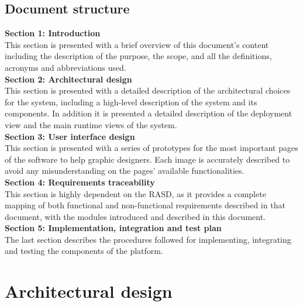 \documentclass[11pt,twoside]{article}
\begin{document}
	\subsection{Document structure}
\textbf{Section 1: Introduction} \\
This section is presented with a brief overview of this document's content including the description of the purpose, the scope, and all the definitions, acronyms and abbreviations used.
\vspace{1\baselineskip} \\
\textbf{Section 2: Architectural design} \\
This section is presented with a detailed description of the architectural choices for the system, including a high-level description of the system and its components. In addition it is presented a detailed description of the deployment view and the main runtime views of the system.
\vspace{1\baselineskip} \\
\textbf{Section 3: User interface design} \\
This section is presented with a series of prototypes for the most important pages of the software to help graphic designers. Each image is accurately described to avoid any misunderstanding on the pages' available functionalities.
\vspace{1\baselineskip} \\
\textbf{Section 4: Requirements traceability} \\
This section is highly dependent on the RASD, as it provides a complete mapping of both functional and non-functional requirements described in that document, with the modules introduced and described in this document.
\vspace{1\baselineskip} \\
\textbf{Section 5: Implementation, integration and test plan} \\
The last section describes the procedures followed for implementing, integrating and testing the components of the platform.

\newpage

\section{Architectural design}
\end{document}
